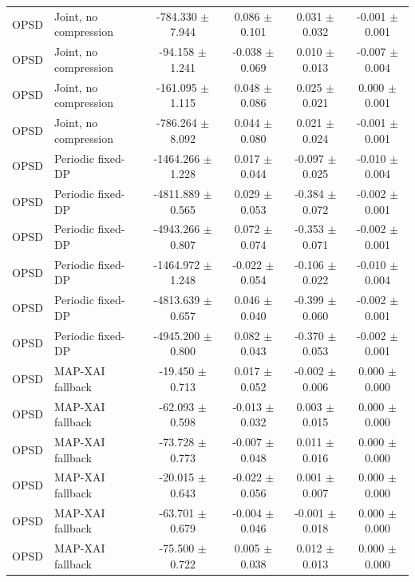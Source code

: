\begin{table}[t]
\begin{tabular}{llcccc}
OPSD & Joint, no compression & -784.330 $\pm$ 7.944 & 0.086 $\pm$ 0.101 & 0.031 $\pm$ 0.032 & -0.001 $\pm$ 0.001 \\
OPSD & Joint, no compression & -94.158 $\pm$ 1.241 & -0.038 $\pm$ 0.069 & 0.010 $\pm$ 0.013 & -0.007 $\pm$ 0.004 \\
OPSD & Joint, no compression & -161.095 $\pm$ 1.115 & 0.048 $\pm$ 0.086 & 0.025 $\pm$ 0.021 & 0.000 $\pm$ 0.001 \\
OPSD & Joint, no compression & -786.264 $\pm$ 8.092 & 0.044 $\pm$ 0.080 & 0.021 $\pm$ 0.024 & -0.001 $\pm$ 0.001 \\
OPSD & Periodic fixed-DP & -1464.266 $\pm$ 1.228 & 0.017 $\pm$ 0.044 & -0.097 $\pm$ 0.025 & -0.010 $\pm$ 0.004 \\
OPSD & Periodic fixed-DP & -4811.889 $\pm$ 0.565 & 0.029 $\pm$ 0.053 & -0.384 $\pm$ 0.072 & -0.002 $\pm$ 0.001 \\
OPSD & Periodic fixed-DP & -4943.266 $\pm$ 0.807 & 0.072 $\pm$ 0.074 & -0.353 $\pm$ 0.071 & -0.002 $\pm$ 0.001 \\
OPSD & Periodic fixed-DP & -1464.972 $\pm$ 1.248 & -0.022 $\pm$ 0.054 & -0.106 $\pm$ 0.022 & -0.010 $\pm$ 0.004 \\
OPSD & Periodic fixed-DP & -4813.639 $\pm$ 0.657 & 0.046 $\pm$ 0.040 & -0.399 $\pm$ 0.060 & -0.002 $\pm$ 0.001 \\
OPSD & Periodic fixed-DP & -4945.200 $\pm$ 0.800 & 0.082 $\pm$ 0.043 & -0.370 $\pm$ 0.053 & -0.002 $\pm$ 0.001 \\
OPSD & MAP-XAI fallback & -19.450 $\pm$ 0.713 & 0.017 $\pm$ 0.052 & -0.002 $\pm$ 0.006 & 0.000 $\pm$ 0.000 \\
OPSD & MAP-XAI fallback & -62.093 $\pm$ 0.598 & -0.013 $\pm$ 0.032 & 0.003 $\pm$ 0.015 & 0.000 $\pm$ 0.000 \\
OPSD & MAP-XAI fallback & -73.728 $\pm$ 0.773 & -0.007 $\pm$ 0.048 & 0.011 $\pm$ 0.016 & 0.000 $\pm$ 0.000 \\
OPSD & MAP-XAI fallback & -20.015 $\pm$ 0.643 & -0.022 $\pm$ 0.056 & 0.001 $\pm$ 0.007 & 0.000 $\pm$ 0.000 \\
OPSD & MAP-XAI fallback & -63.701 $\pm$ 0.679 & -0.004 $\pm$ 0.046 & -0.001 $\pm$ 0.018 & 0.000 $\pm$ 0.000 \\
OPSD & MAP-XAI fallback & -75.500 $\pm$ 0.722 & 0.005 $\pm$ 0.038 & 0.012 $\pm$ 0.013 & 0.000 $\pm$ 0.000 \\
\bottomrule
\end{tabular}
\end{table}
